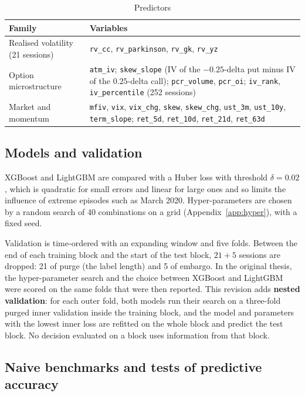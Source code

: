 \documentclass[11pt,a4paper]{article}
\begin{document}
\begin{table}[!htbp]
\centering
\caption{Predictors}\label{tab:features}
\small
\begin{tabularx}{\linewidth}{@{}lX@{}}
\toprule
Family & Variables \\
\midrule
Realised volatility (21 sessions) & \texttt{rv\_cc}, \texttt{rv\_parkinson}, \texttt{rv\_gk}, \texttt{rv\_yz} \\
Option microstructure & \texttt{atm\_iv}; \texttt{skew\_slope} (IV of the $-0.25$-delta put minus IV of the $0.25$-delta call); \texttt{pcr\_volume}, \texttt{pcr\_oi}; \texttt{iv\_rank}, \texttt{iv\_percentile} (252 sessions) \\
Market and momentum & \texttt{mfiv}, \texttt{vix}, \texttt{vix\_chg}, \texttt{skew}, \texttt{skew\_chg}, \texttt{ust\_3m}, \texttt{ust\_10y}, \texttt{term\_slope}; \texttt{ret\_5d}, \texttt{ret\_10d}, \texttt{ret\_21d}, \texttt{ret\_63d} \\
\bottomrule
\end{tabularx}
\end{table}

\subsection{Models and validation}

XGBoost and LightGBM are compared with a Huber loss \citep{huber1964} with threshold $\delta=0.02$, which is quadratic for small errors and linear for large ones and so limits the influence of extreme episodes such as March 2020. Hyper-parameters are chosen by a random search of 40 combinations on a grid (Appendix~\ref{app:hyper}), with a fixed seed.

Validation is time-ordered with an expanding window and five folds. Between the end of each training block and the start of the test block, $21+5$ sessions are dropped: 21 of purge (the label length) and 5 of embargo. In the original thesis, the hyper-parameter search and the choice between XGBoost and LightGBM were scored on the same folds that were then reported. This revision adds \textbf{nested validation}: for each outer fold, both models run their search on a three-fold purged inner validation inside the training block, and the model and parameters with the lowest inner loss are refitted on the whole block and predict the test block. No decision evaluated on a block uses information from that block.

\subsection{Naive benchmarks and tests of predictive accuracy}
\end{document}
